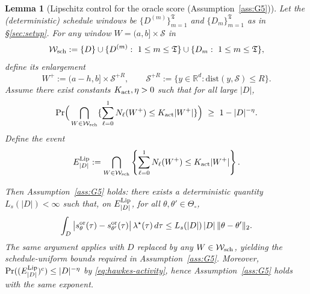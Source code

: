 \documentclass{statsoc}
\newtheorem{lemma}[lemma]{Lemma}
\newcommand{\bbR}{\mathbb{R}}
\newcommand{\1}{\mathbbm{1}}
\newcommand{\Tmax}{\mathfrak{T}}
\begin{document}
\begin{lemma}[Lipschitz control for the oracle score (Assumption~\ref{ass:G5})]
\smallskip
{}
Let the (deterministic) schedule windows be $\{D^{(m)}\}_{m=1}^{\Tmax}$ and $\{D_m\}_{m=1}^{\Tmax}$ as in \S\ref{sec:setup}.
For any window $W=(a,b]\times\mathcal S$ in
\[
\mathcal W_{\rm sch}:=\{D\}\cup\{D^{(m)}:\ 1\le m\le \Tmax\}\cup\{D_m:\ 1\le m\le \Tmax\},
\]
define its enlargement
\[
W^+:=(a-h,b]\times\mathcal S^{+R},
\qquad
\mathcal S^{+R}:=\{y\in\bbR^d:\mathrm{dist}(y,\mathcal S)\le R\}.
\]
Assume there exist constants $K_{\rm act},\eta>0$ such that for all large $|D|$,
\[
\Pr\!\Big(\bigcap_{W\in\mathcal W_{\rm sch}}\{\sum_{\ell=0}^1 N_\ell(W^+)\le K_{\rm act}|W^+|\}\Big)\ \ge\ 1-|D|^{-\eta}.\label{eq:hawkes-activity}
\]
Define the event
\[
E^{\rm Lip}_{|D|}
:=
\bigcap_{W\in\mathcal W_{\rm sch}}\left\{\sum_{\ell=0}^1 N_\ell(W^+)\le K_{\rm act}|W^+|\right\}.
\]

\smallskip
Then Assumption~\ref{ass:G5} holds: there exists a deterministic quantity $L_s(|D|)<\infty$ such that, on
$E^{\rm Lip}_{|D|}$, for all $\theta,\theta'\in\Theta_\circ$,
\begin{equation}
\label{eq:G5-hawkes}
\int_D \big|s^{\rm or}_\theta(\tau)-s^{\rm or}_{\theta'}(\tau)\big|\,\lambda^\star(\tau)\,d\tau
\le
L_s(|D|)\,|D|\,\|\theta-\theta'\|_2.
\end{equation}
The same argument applies with $D$ replaced by any $W\in\mathcal W_{\rm sch}$, yielding the schedule-uniform bounds required in Assumption~\ref{ass:G5}. Moreover, $\Pr((E^{\rm Lip}_{|D|})^c)\le |D|^{-\eta}$ by \eqref{eq:hawkes-activity}, hence Assumption~\ref{ass:G5} holds with the same exponent.

\end{lemma}
\end{document}
